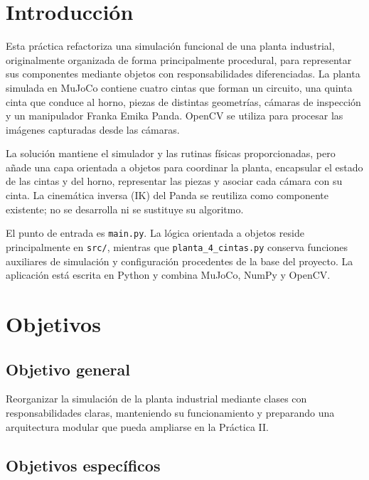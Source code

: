 \documentclass[12pt,a4paper]{article}
\begin{document}

\section{Introducción}

Esta práctica refactoriza una simulación funcional de una planta industrial,
originalmente organizada de forma principalmente procedural, para representar
sus componentes mediante objetos con responsabilidades diferenciadas. La planta
simulada en MuJoCo contiene cuatro cintas que forman un circuito, una quinta
cinta que conduce al horno, piezas de distintas geometrías, cámaras de
inspección y un manipulador Franka Emika Panda. OpenCV se utiliza para procesar
las imágenes capturadas desde las cámaras.

La solución mantiene el simulador y las rutinas físicas proporcionadas, pero
añade una capa orientada a objetos para coordinar la planta, encapsular el
estado de las cintas y del horno, representar las piezas y asociar cada cámara
con su cinta. La cinemática inversa (IK) del Panda se reutiliza como componente
existente; no se desarrolla ni se sustituye su algoritmo.

El punto de entrada es \texttt{main.py}. La lógica orientada a objetos reside
principalmente en \texttt{src/}, mientras que \texttt{planta\_4\_cintas.py}
conserva funciones auxiliares de simulación y configuración procedentes de la
base del proyecto. La aplicación está escrita en Python y combina MuJoCo,
NumPy y OpenCV.


\section{Objetivos}

\subsection{Objetivo general}

Reorganizar la simulación de la planta industrial mediante clases con
responsabilidades claras, manteniendo su funcionamiento y preparando una
arquitectura modular que pueda ampliarse en la Práctica II.

\subsection{Objetivos específicos}
\end{document}

